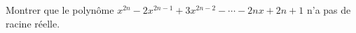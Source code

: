 Montrer que le polynôme $x^{2n} - 2x^{2n-1} + 3x^{2n-2} - \cdots - 2nx + 2n + 1$ n'a pas de racine réelle.
